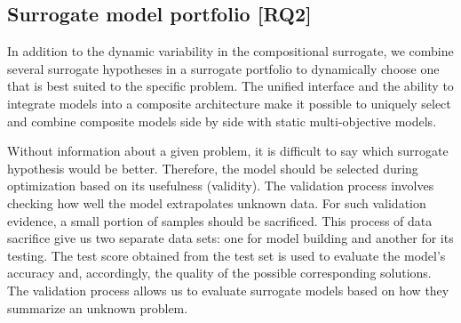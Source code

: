             
        
        \subsection{Surrogate model portfolio [RQ2]}
            In addition to the dynamic variability in the compositional surrogate, we combine several surrogate hypotheses in a surrogate portfolio to dynamically choose one that is best suited to the specific problem. The unified interface and the ability to integrate models into a composite architecture make it possible to uniquely select and combine composite models side by side with static multi-objective models.

            Without information about a given problem, it is difficult to say which surrogate hypothesis would be better. Therefore, the model should be selected during optimization based on its usefulness (validity). The validation process involves checking how well the model extrapolates unknown data. For such validation evidence, a small portion of samples should be sacrificed. This process of data sacrifice give us two separate data sets: one for model building and another for its testing. The test score obtained from the test set is used to evaluate the model's accuracy and, accordingly, the quality of the possible corresponding solutions.
            The validation process allows us to evaluate surrogate models based on how they summarize an unknown problem.
            
